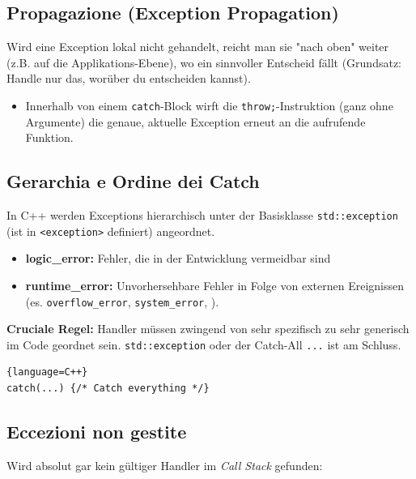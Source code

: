 \subsection{Propagazione (Exception Propagation)}
Wird eine Exception lokal nicht gehandelt, reicht man sie "nach oben" weiter (z.B. auf die Applikations-Ebene), wo ein sinnvoller Entscheid fällt (Grundsatz: Handle nur das, worüber du entscheiden kannst). 
\begin{itemize}
    \item Innerhalb von einem \texttt{catch}-Block wirft die \texttt{throw;}-Instruktion (ganz ohne Argumente) die genaue, aktuelle Exception erneut an die aufrufende Funktion.
\end{itemize}

\subsection{Gerarchia e Ordine dei Catch}
In C++ werden Exceptions hierarchisch unter der Basisklasse \texttt{std::exception} (ist in \texttt{<exception>} definiert) angeordnet. 
\begin{itemize}
    \item \textbf{logic\_error: } Fehler, die in der Entwicklung vermeidbar sind
    \item \textbf{runtime\_error:} Unvorhersehbare Fehler in Folge von externen Ereignissen\\
    (es. \texttt{overflow\_error}, \texttt{system\_error}, ).
\end{itemize}

\medbreak

\textbf{\color{orange}Cruciale Regel:} Handler müssen zwingend von sehr spezifisch zu sehr generisch im Code geordnet sein. \texttt{std::exception} oder der Catch-All \texttt{...} ist am Schluss.

\begin{lstlisting}{language=C++}
catch(...) {/* Catch everything */}
\end{lstlisting}

\resizebox{\columnwidth}{!}{

}

\example{}
\vspace{-1em}

\subsection{Eccezioni non gestite}
Wird absolut gar kein gültiger Handler im \textit{Call Stack} gefunden:


